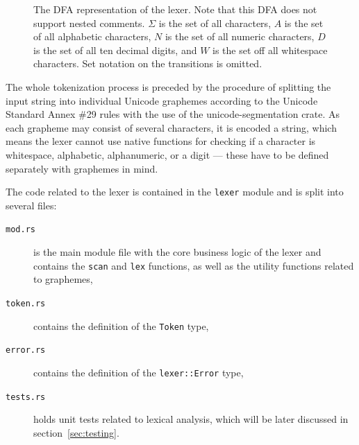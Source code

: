 \documentclass[english,engineering]{wizthesis}
\begin{document}
\begin{figure}[ht]
{
  }
  \caption{The DFA representation of the lexer. Note that this DFA does not
  support nested comments. $\Sigma$ is the set of all characters, $A$ is the set
  of all alphabetic characters, $N$ is the set of all numeric characters, $D$ is
  the set of all ten decimal digits, and $W$ is the set off all whitespace
  characters. Set notation on the transitions is omitted.}
  \label{fig:lexer-dfa}
\end{figure}

The whole tokenization process is preceded by the procedure of splitting the
input string into individual Unicode graphemes according to the Unicode Standard
Annex \#29 \cite{unicode-standard-annex-29} rules with the use of the
unicode-segmentation crate. As each grapheme may consist of several characters,
it is encoded a string, which means the lexer cannot use native functions for
checking if a character is whitespace, alphabetic, alphanumeric, or a digit ---
these have to be defined separately with graphemes in mind.

The code related to the lexer is contained in the \texttt{lexer} module and is
split into several files:
\begin{description}
  \item[\texttt{mod.rs}] is the main module file with the core business logic of
  the lexer and contains the \texttt{scan} and \texttt{lex} functions, as well
  as the utility functions related to graphemes,
  \item[\texttt{token.rs}] contains the definition of the \texttt{Token} type,
  \item[\texttt{error.rs}] contains the definition of the \texttt{lexer::Error}
  type,
  \item[\texttt{tests.rs}] holds unit tests related to lexical analysis, which
  will be later discussed in section~\ref{sec:testing}.
\end{description}
\end{document}
